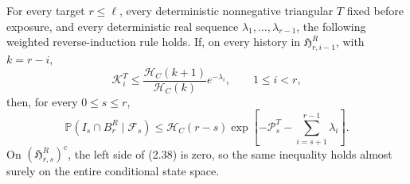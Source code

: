 \begin{lemma}
\label{lem:weighted-reverse}
For every target \(r\le\ell\), every deterministic nonnegative
triangular \(T\) fixed before exposure, and every deterministic real sequence
\(\lambda_1,\ldots,\lambda_{r-1}\), the following weighted reverse-induction
rule holds.  If, on every history in \(\mathfrak H^R_{r,i-1}\), with
\(k=r-i\),
\[
 \mathcal K_i^T\le
 \frac{\mathcal H_C(k+1)}{\mathcal H_C(k)}e^{-\lambda_i},
 \qquad 1\le i<r,
\tag{2.37}
\]
then, for every \(0\le s\le r\),
\[
 \mathbb P(I_s\cap B^R_r\mid\mathcal F_s)
 \le\mathcal H_C(r-s)
 \exp\!\left[-\mathcal P_s^T-
 \sum_{i=s+1}^{r-1}\lambda_i\right].
\tag{2.38}
\]
On \((\mathfrak H^R_{r,s})^c\), the left side of (2.38) is zero, so the same
inequality holds almost surely on the entire conditional state space.
\end{lemma}

